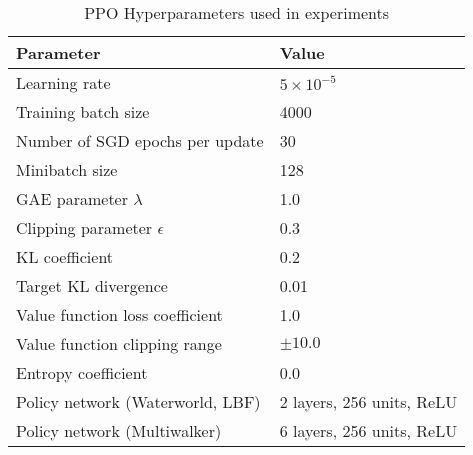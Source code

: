 \documentclass{article}
\begin{document}
\begin{table}[h]
    \centering
    \caption{PPO Hyperparameters used in experiments}
    \begin{tabular}{ll}
    \toprule
    \textbf{Parameter} & \textbf{Value} \\
    \midrule
    Learning rate & $5 \times 10^{-5}$ \\
    Training batch size & 4000 \\
    Number of SGD epochs per update & 30 \\
    Minibatch size & 128 \\
    GAE parameter $\lambda$ & 1.0 \\
    Clipping parameter $\epsilon$ & 0.3 \\
    KL coefficient & 0.2 \\
    Target KL divergence & 0.01 \\
    Value function loss coefficient & 1.0 \\
    Value function clipping range & $\pm 10.0$ \\
    Entropy coefficient & 0.0 \\
    Policy network (Waterworld, LBF) & 2 layers, 256 units, ReLU \\%
    Policy network (Multiwalker) & 6 layers, 256 units, ReLU \\%
    \bottomrule
    \end{tabular}
    \label{tab:ppo-hyperparams}
\end{table}

\vspace{3em}

        
        
        
\end{document}
